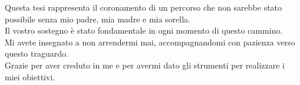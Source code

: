 
%

\begin{ntdedicatory}

    Questa tesi rappresenta il coronamento di un percorso che non sarebbe stato possibile senza mio padre, mia madre e mia sorella. \\ Il vostro sostegno è stato fondamentale in ogni momento di questo cammino. \\ Mi avete insegnato a non arrendermi mai, accompagnandomi con pazienza verso questo traguardo. \\ Grazie per aver creduto in me e per avermi dato gli strumenti per realizzare i miei obiettivi.

\end{ntdedicatory}


